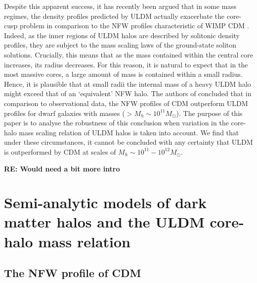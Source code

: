 \documentclass[a4paper,11pt]{article}
\newcommand{\re}[1]{{{\bf \color{green} RE: #1}}}
\begin{document}
Despite this apparent success, it has recently been argued that in some mass regimes, the density profiles predicted by ULDM actually exacerbate the core-cusp problem in comparison to the NFW profiles characteristic of WIMP CDM \cite{Robles:2018fur}. Indeed, as the inner regions of ULDM halos are described by solitonic density profiles, they are subject to the mass scaling laws of the ground-state soliton solutions. Crucially, this means that as the mass contained within the central core increases, its radius decreases. For this reason, it is natural to expect that in the most massive cores, a large amount of mass is contained within a small radius. Hence, it is plausible that at small radii the internal mass of a heavy ULDM halo might exceed that of an `equivalent' NFW halo. The authors of \cite{Robles:2018fur} concluded that in comparison to observational data, the NFW profiles of CDM outperform ULDM profiles for dwarf galaxies with masses ($> M_h \sim 10^{11} M_{\odot}$). The purpose of this paper is to analyse the robustness of this conclusion when variation in the core-halo mass scaling relation of ULDM halos is taken into account. We find that under these circumstances, it cannot be concluded with any certainty that ULDM is outperformed by CDM at scales of $M_h \sim 10^{11}-10^{12} M_{\odot}$.

\re{Would need a bit more intro}







\section{Semi-analytic models of dark matter halos and the ULDM core-halo mass relation}

\subsection{The NFW profile of CDM}
\end{document}
